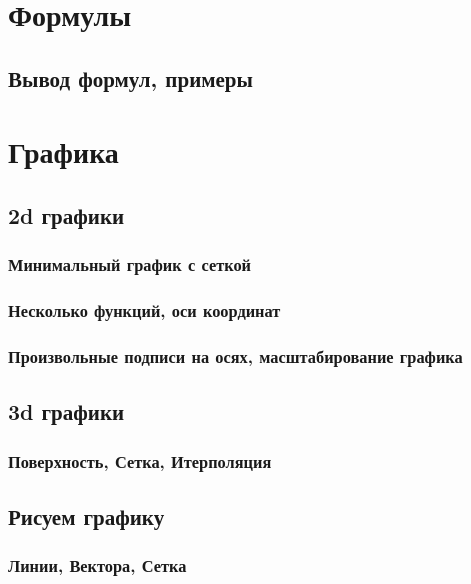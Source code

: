 \documentclass[a4paper,14pt]{book}
\begin{document}
\section{Формулы}

\subsection{Вывод формул, примеры}

\section{Графика}

\subsection{2d графики}

\subsubsection{Минимальный график с сеткой}


\subsubsection{Несколько функций, оси координат}


\subsubsection{Произвольные подписи на осях, масштабирование графика}

\subsection{3d графики}

\subsubsection{Поверхность, Сетка, Итерполяция}


\subsection{Рисуем графику}

\subsubsection{Линии, Вектора, Сетка}
\end{document}
